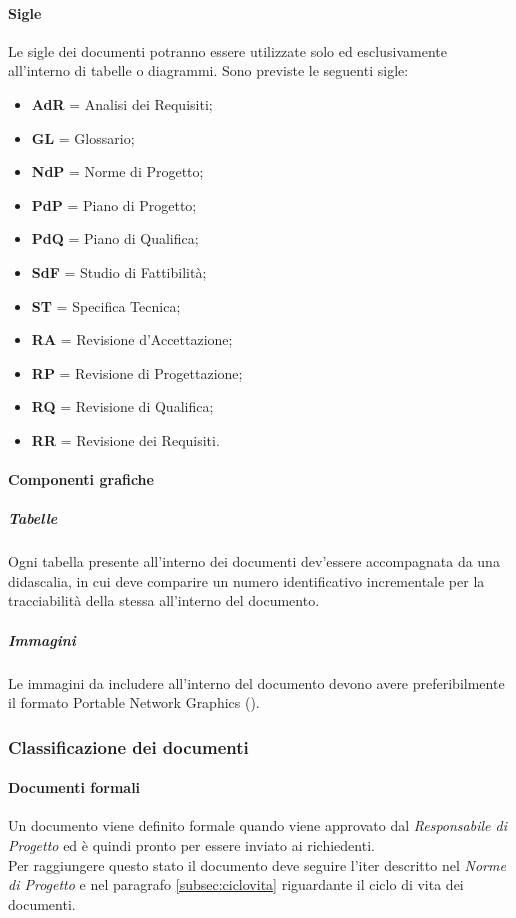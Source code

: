       \paragraph{Sigle}
        Le sigle dei documenti potranno essere utilizzate solo ed esclusivamente all'interno di tabelle o diagrammi. Sono previste le seguenti sigle:
        \begin{itemize}
          \item \textbf{AdR} = Analisi dei Requisiti;
          \item \textbf{GL} = Glossario;
          \item \textbf{NdP} = Norme di Progetto;
          \item \textbf{PdP} = Piano di Progetto;
          \item \textbf{PdQ} = Piano di Qualifica;
          \item \textbf{SdF} = Studio di Fattibilità;
          \item \textbf{ST} = Specifica Tecnica;
          \item \textbf{RA} = Revisione d'Accettazione;
          \item \textbf{RP} = Revisione di Progettazione;
          \item \textbf{RQ} = Revisione di Qualifica;
          \item \textbf{RR} = Revisione dei Requisiti.
        \end{itemize}
    \paragraph{Componenti grafiche}
      \subparagraph{Tabelle}
        Ogni tabella presente all’interno dei documenti dev’essere accompagnata da una didascalia, in cui deve comparire un numero identificativo incrementale per la tracciabilità
        della stessa all’interno del documento.
      \subparagraph{Immagini}
        Le immagini da includere all'interno del documento devono avere preferibilmente il formato Portable Network Graphics ().
        
        \subsubsection{Classificazione dei documenti}
  \paragraph{Documenti formali}
        Un documento viene definito formale quando viene approvato dal \emph{Responsabile di Progetto} ed è quindi pronto per essere inviato ai richiedenti.\\
        Per raggiungere questo stato il documento deve seguire l'iter descritto nel \emph{Norme di Progetto} e nel paragrafo \ref{subsec:ciclovita} riguardante il ciclo di vita dei documenti.
